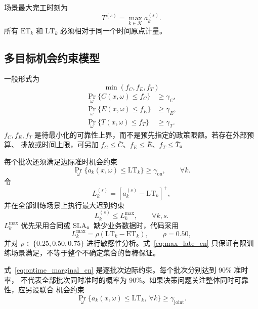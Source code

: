 场景最大完工时刻为
\begin{equation}
 T^{(s)}=\max_{k\in\mathcal K}a_k^{(s)}.
\end{equation}
所有 $\mathrm{ET}_k$ 和 $\mathrm{LT}_k$ 必须相对于同一个时间原点计量。

\subsection{多目标机会约束模型}

一般形式为
\begin{equation}
 \min(f_C,f_E,f_T)
\end{equation}
\begin{align}
 \Pr_{\omega}\{C(x,\omega)\le f_C\}&\ge\gamma_C,\\
 \Pr_{\omega}\{E(x,\omega)\le f_E\}&\ge\gamma_E,\\
 \Pr_{\omega}\{T(x,\omega)\le f_T\}&\ge\gamma_T.
\end{align}
$f_C,f_E,f_T$ 是待最小化的可靠性上界，而不是预先指定的政策限额。若存在外部预算、
排放或时间上限，可另加 $f_C\le\bar C$、$f_E\le\bar E$、$f_T\le\bar T$。

每个批次还须满足边际准时机会约束
\begin{equation}\label{eq:ontime_marginal_cn}
 \Pr_{\omega}\{a_k(x,\omega)\le\mathrm{LT}_k\}
 \ge\gamma_{\mathrm{on}},\qquad\forall k.
\end{equation}
令
\begin{equation}
 L_k^{(s)}=[a_k^{(s)}-\mathrm{LT}_k]^+,
\end{equation}
并在全部训练场景上执行最大迟到约束
\begin{equation}\label{eq:max_late_cn}
 L_k^{(s)}\le L_k^{\max},\qquad\forall k,s.
\end{equation}
$L_k^{\max}$ 优先采用合同或 SLA。缺少业务数据时，代码采用
\begin{equation}
 L_k^{\max}=\rho(\mathrm{LT}_k-\mathrm{ET}_k),\qquad \rho=0.50,
\end{equation}
并对 $\rho\in\{0.25,0.50,0.75\}$ 进行敏感性分析。式~\eqref{eq:max_late_cn}
只保证有限训练场景满足，不等于整个不确定集合的鲁棒保证。

式~\eqref{eq:ontime_marginal_cn} 是逐批次边际约束。每个批次分别达到 90\% 准时率，
不代表全部批次同时准时的概率为 90\%。如果决策问题关注整体同时可靠性，应另设联合
机会约束
\begin{equation}
 \Pr_{\omega}\{a_k(x,\omega)\le\mathrm{LT}_k,\ \forall k\}
 \ge\gamma_{\mathrm{joint}}.
\end{equation}

